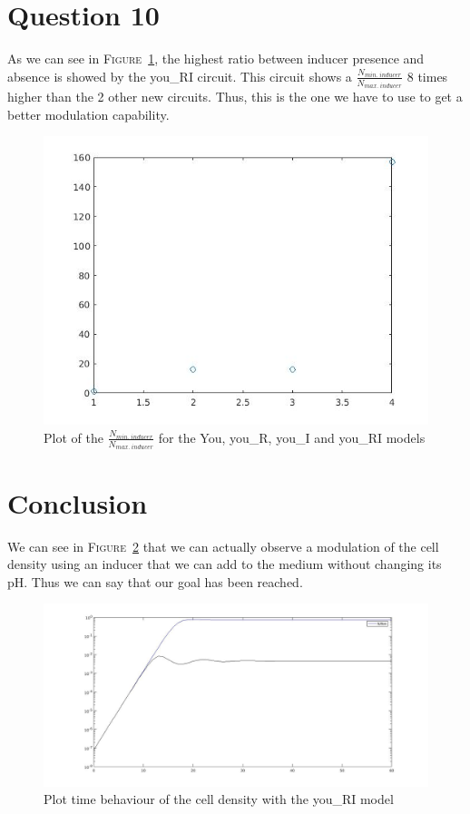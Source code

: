 \documentclass[11pt,a4paper]{report}
\begin{document}
\section*{Question 10}
As we can see in \textsc{Figure}~\ref{q10}, the highest ratio between inducer presence and absence is showed by the you\_RI circuit. This circuit shows a $\frac{N_{min.~inducer} }{N_{max.~inducer}}$ 8 times higher than the 2 other new circuits. Thus, this is the one we have to use to get a better modulation capability.
\begin{figure}[!ht]
  \begin{center}
    \includegraphics[width=0.7\linewidth]{Figure9.jpg}
    \caption{Plot of the $\frac{N_{min.~inducer} }{N_{max.~inducer}}$ for the You, you\_R, you\_I and you\_RI models}
    \label{q10}
  \end{center}
\end{figure}

\section*{Conclusion}

We can see in \textsc{Figure}~\ref{qC} that we can actually observe a modulation of the cell density using an inducer that we can add to the medium without changing its pH. Thus we can say that our goal has been reached.\\

\begin{figure}[!ht]
  \begin{center}
    \includegraphics[width=\linewidth]{Figure10.jpg}
    \caption{Plot time behaviour of the cell density with the you\_RI model}
    \label{qC}
  \end{center}
\end{figure}
\end{document}
